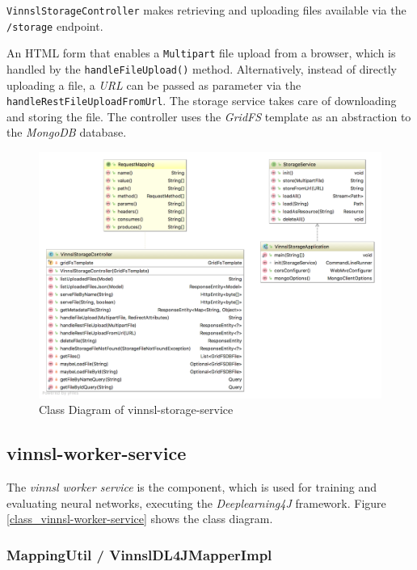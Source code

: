 \texttt{VinnslStorageController} makes retrieving and uploading files
available via the \texttt{/storage} endpoint.

An HTML form that enables a \texttt{Multipart} file upload from a
browser, which is handled by the \texttt{handleFileUpload()} method.
Alternatively, instead of directly uploading a file, a \emph{URL} can be
passed as parameter via the \texttt{handleRestFileUploadFromUrl}. The
storage service takes care of downloading and storing the file. The
controller uses the \emph{GridFS} template as an abstraction to the
\emph{MongoDB} database.

\begin{figure}
\centering
\includegraphics[width=15.00000cm]{images/uml-class-diagram-vinnsl-storage-service}
\caption{Class Diagram of vinnsl-storage-service
\label{class_vinnsl-storage-service}}
\end{figure}

\subsection{vinnsl-worker-service}\label{vinnsl-worker-service}

The \emph{vinnsl worker service} is the component, which is used for
training and evaluating neural networks, executing the
\emph{Deeplearning4J} framework. Figure
\ref{class_vinnsl-worker-service} shows the class diagram.

\subsubsection{MappingUtil /
VinnslDL4JMapperImpl}\label{mappingutil-vinnsldl4jmapperimpl}

